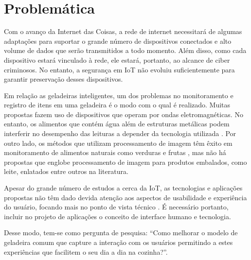 \section{Problemática}


Com o avanço da Internet das Coisas, a rede de internet necessitará de algumas adaptações para suportar o grande número de dispositivos conectados e alto volume de dados que serão transmitidos a todo momento. Além disso, como cada dispositivo estará vinculado à rede, ele estará, portanto, ao alcance de ciber criminosos. No entanto, a segurança em IoT não evoluiu suficientemente para garantir preservação desses dispositivos.

Em relação as geladeiras inteligentes, um dos problemas no monitoramento e registro de itens em uma geladeira é o modo com o qual é realizado. Muitas propostas fazem uso de dispositivos que operam por ondas eletromagnéticas. No entanto, os alimentos que contém água além de estruturas metálicas podem interferir no desempenho das leituras a depender da tecnologia utilizada \cite{Periyasamy2015} \cite{Qing2007}. Por outro lado, os métodos que utilizam processamento de imagem têm êxito em monitoramento de alimentos naturais como verduras e frutas \cite{Shweta2017}, mas não há propostas que englobe processamento de imagem para produtos embalados, como leite, enlatados entre outros na literatura.

Apesar do grande número de estudos a cerca da IoT, as tecnologias e aplicações propostas não têm dado devida atenção aos aspectos de usabilidade e experiência do usuário, focando mais no ponto de vista técnico \cite{Koreshoff2013}. É necessário portanto, incluir no projeto de aplicações o conceito de interface humano e tecnologia.

Desse modo, tem-se como pergunta de pesquisa: ``Como melhorar o modelo de geladeira comum que capture a interação com os usuários permitindo a estes experiências que facilitem o seu dia a dia na cozinha?''.


